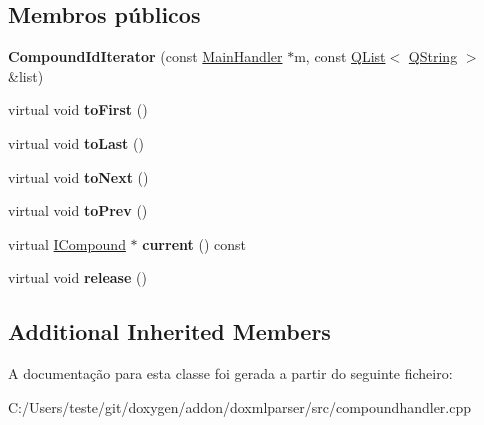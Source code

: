 \subsection*{Membros públicos}
\begin{DoxyCompactItemize}
\item 
\hypertarget{class_compound_id_iterator_a9dd0b4d60acc882ad19e850d97db1962}{{\bfseries Compound\-Id\-Iterator} (const \hyperlink{class_main_handler}{Main\-Handler} $\ast$m, const \hyperlink{class_q_list}{Q\-List}$<$ \hyperlink{class_q_string}{Q\-String} $>$ \&list)}\label{class_compound_id_iterator_a9dd0b4d60acc882ad19e850d97db1962}

\item 
\hypertarget{class_compound_id_iterator_a24528c52410032763cedaccdfbe474e5}{virtual void {\bfseries to\-First} ()}\label{class_compound_id_iterator_a24528c52410032763cedaccdfbe474e5}

\item 
\hypertarget{class_compound_id_iterator_ac4e23694db19ee84c4e110f9965d64e4}{virtual void {\bfseries to\-Last} ()}\label{class_compound_id_iterator_ac4e23694db19ee84c4e110f9965d64e4}

\item 
\hypertarget{class_compound_id_iterator_ad8ecebd1a267185e69e1b6fe4e9f331e}{virtual void {\bfseries to\-Next} ()}\label{class_compound_id_iterator_ad8ecebd1a267185e69e1b6fe4e9f331e}

\item 
\hypertarget{class_compound_id_iterator_a3491dc4d8ab54f0a0583ac1941f4e94f}{virtual void {\bfseries to\-Prev} ()}\label{class_compound_id_iterator_a3491dc4d8ab54f0a0583ac1941f4e94f}

\item 
\hypertarget{class_compound_id_iterator_aed1ddf0744f763ffafe54f63da2080bb}{virtual \hyperlink{class_i_compound}{I\-Compound} $\ast$ {\bfseries current} () const }\label{class_compound_id_iterator_aed1ddf0744f763ffafe54f63da2080bb}

\item 
\hypertarget{class_compound_id_iterator_af8a84115de3507728d5e19e804529052}{virtual void {\bfseries release} ()}\label{class_compound_id_iterator_af8a84115de3507728d5e19e804529052}

\end{DoxyCompactItemize}
\subsection*{Additional Inherited Members}


A documentação para esta classe foi gerada a partir do seguinte ficheiro\-:\begin{DoxyCompactItemize}
\item 
C\-:/\-Users/teste/git/doxygen/addon/doxmlparser/src/compoundhandler.\-cpp\end{DoxyCompactItemize}

